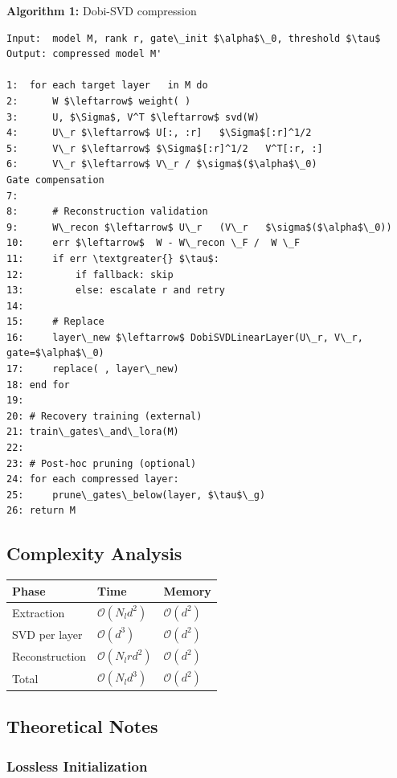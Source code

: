 \textbf{Algorithm 1:} Dobi-SVD compression
\begin{lstlisting}
Input:  model M, rank r, gate\_init $\alpha$\_0, threshold $\tau$
Output: compressed model M'

1:  for each target layer   in M do
2:      W $\leftarrow$ weight( )
3:      U, $\Sigma$, V^T $\leftarrow$ svd(W)
4:      U\_r $\leftarrow$ U[:, :r]   $\Sigma$[:r]^1/2
5:      V\_r $\leftarrow$ $\Sigma$[:r]^1/2   V^T[:r, :]
6:      V\_r $\leftarrow$ V\_r / $\sigma$($\alpha$\_0)               Gate compensation
7:
8:      # Reconstruction validation
9:      W\_recon $\leftarrow$ U\_r   (V\_r   $\sigma$($\alpha$\_0))
10:     err $\leftarrow$  W - W\_recon \_F /  W \_F
11:     if err \textgreater{} $\tau$:
12:         if fallback: skip  
13:         else: escalate r and retry
14:
15:     # Replace
16:     layer\_new $\leftarrow$ DobiSVDLinearLayer(U\_r, V\_r, gate=$\alpha$\_0)
17:     replace( , layer\_new)
18: end for
19:
20: # Recovery training (external)
21: train\_gates\_and\_lora(M)
22:
23: # Post-hoc pruning (optional)
24: for each compressed layer:
25:     prune\_gates\_below(layer, $\tau$\_g)
26: return M
\end{lstlisting}

\subsection{Complexity Analysis}

\begin{table}[H]
\centering
\small
\begin{tabular}{lll}
\toprule
\textbf{Phase} & \textbf{Time} & \textbf{Memory} \\
\midrule
Extraction & $\mathcal{O}(N_l d^2)$ & $\mathcal{O}(d^2)$ \\
SVD per layer & $\mathcal{O}(d^3)$ & $\mathcal{O}(d^2)$ \\
Reconstruction & $\mathcal{O}(N_l r d^2)$ & $\mathcal{O}(d^2)$ \\
Total & $\mathcal{O}(N_l d^3)$ & $\mathcal{O}(d^2)$ \\
\bottomrule
\end{tabular}
\end{table}

\subsection{Theoretical Notes}

\subsubsection{Lossless Initialization}

